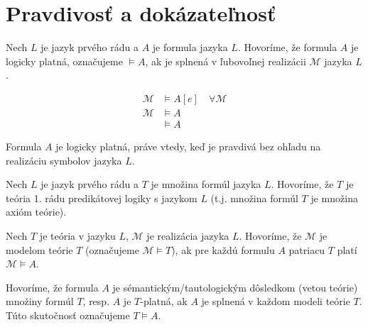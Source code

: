 \section{Pravdivosť a dokázateľnosť}

\begin{definicia}
    Nech $L$ je jazyk prvého rádu a $A$ je formula jazyka
    $L$. Hovoríme, že formula $A$ je logicky platná,
    označujeme $\models A$,
    ak je splnená v ľubovoľnej realizácii $\mathcal{M}$ jazyka $L$.

    \begin{align*}
        \mathcal{M} & \models A[e] \quad \forall \mathcal{M} \\
        \mathcal{M} & \models A \\
        & \models A
    \end{align*}
\end{definicia}

\begin{poznamka}
    Formula $A$ je logicky platná, práve vtedy, keď je pravdivá
    bez ohľadu na realizáciu symbolov jazyka $L$.
\end{poznamka}

\begin{definicia}[Teória]
    Nech $L$ je jazyk prvého rádu a $T$ je množina formúl
    jazyka $L$. Hovoríme, že $T$ je teória 1. rádu predikátovej logiky
    s jazykom $L$ (t.j. množina formúl $T$ je množina axióm teórie).
\end{definicia}

\begin{definicia}
    Nech $T$ je teória v jazyku $L$, $\mathcal{M}$ je realizácia jazyka $L$.
    Hovoríme, že $\mathcal{M}$ je modelom teórie $T$ (označujeme
    $\mathcal{M} \models T$), ak pre každú formulu $A$
    patriacu $T$ platí $\mathcal{M} \models A$.
\end{definicia}

\begin{definicia}
    Hovoríme, že formula $A$ je
    sémantickým/tautologickým dôsledkom (vetou teórie) množiny formúl $T$,
    resp. $A$ je $T$-platná, ak $A$ je splnená v každom modeli teórie $T$.
    Túto skutočnosť označujeme $T \models A$.
\end{definicia}


